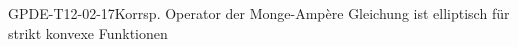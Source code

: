 
\begin{EXA}{GPDE-T12-02-17}{Korrsp. Operator der Monge-Ampère Gleichung ist elliptisch für strikt konvexe Funktionen}
\end{EXA}

